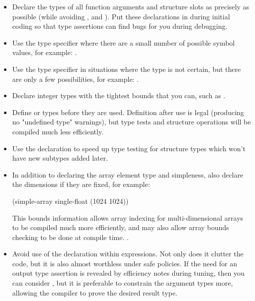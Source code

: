 \begin{itemize}

\item
Declare the types of all function arguments and structure slots as precisely as
possible (while avoiding ,  and ).  Put these
declarations in during initial coding so that type assertions can find bugs for
you during debugging.

\item
Use the  type specifier where there are a small number of possible
symbol values, for example: .

\item
Use the  type specifier in situations where the type is
not certain, but there are only a few possibilities, for example:
.

\item
Declare integer types with the tightest bounds that you can, such as 
.

\item
Define  or  types before they
are used.  Definition after use is legal (producing no "undefined
type" warnings), but type tests and structure operations will be
compiled much less efficiently.

\item
Use the  declaration to speed up type testing for
structure types which won't have new subtypes added later. 

\item
In addition to declaring the array element type and simpleness, also declare
the dimensions if they are fixed, for example:
\begin{example}
(simple-array single-float (1024 1024))
\end{example}
This bounds information allows array indexing for multi-dimensional arrays to
be compiled much more efficiently, and may also allow array bounds checking to
be done at compile time.  .

\item
Avoid use of the  declaration within expressions.  Not
only does it clutter the code, but it is also almost worthless under
safe policies.  If the need for an output type assertion is revealed
by efficiency notes during tuning, then you can consider , but
it is preferable to constrain the argument types more, allowing the
compiler to prove the desired result type.


\end{itemize}
